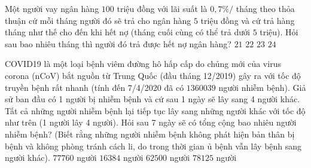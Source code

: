 \begin{ex}%
    [Bỉm Sơn - Thanh Hóa - 2020]%
    Một người vay ngân hàng $100$ triệu đồng với lãi suất là $0{,}7\%/$ tháng theo thỏa thuận cứ mỗi tháng người đó sẽ trả cho ngân hàng $5$ triệu đồng và cứ trả hàng tháng như thế cho đến khi hết nợ (tháng cuối cùng có thể trả dưới $5$ triệu). Hỏi sau bao nhiêu tháng thì người đó trả được hết nợ ngân hàng?
    \choice
    {$21$}
    {\True $22$}
    {$23$}
    {$24$}
\end{ex}
\begin{ex}%
    [Lê Lai - Thanh Hóa - 2020]%
    COVID19 là một loại bệnh viêm đường hô hấp cấp do chủng mới của virus corona (nCoV) bắt nguồn từ Trung Quốc (đầu tháng 12/2019) gây ra với tốc độ truyền bệnh rất nhanh (tính đến 7/4/2020 đã có $1360039$ người nhiễm bệnh). Giả sử ban đầu có 1 người bị nhiễm bệnh và cứ sau 1 ngày sẽ lây sang 4 người khác. Tất cả những người nhiễm bệnh lại tiếp tục lây sang những người khác với tốc độ như trên (1 người lây 4 người). Hỏi sau 7 ngày sẽ có tổng cộng bao nhiêu người nhiễm bệnh? (Biết rằng những người nhiễm bệnh không phát hiện bản thân bị bệnh và không phòng tránh cách li, do trong thời gian ủ bệnh vẫn lây bệnh sang người khác).
    \choice
    {$77760$ người}
    {$16384$ người}
    {$62500$ người}
    {\True $78125$ người}
\end{ex}
